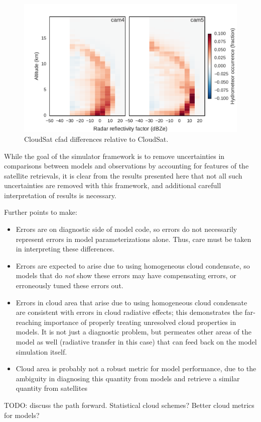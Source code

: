 \begin{figure}[htbp]
\centering
\includegraphics{graphics/cmip5_cfadDbze94_NHTropics_diff.pdf}
\caption{\label{fig:cmip5_cfads_diffs}CloudSat cfad differences relative
to CloudSat.}\label{fig:cmip5ux5fcfadsux5fdiffs}
\end{figure}

While the goal of the simulator framework is to remove uncertainties in
comparisons between models and observations by accounting for features
of the satellite retrievals, it is clear from the results presented here
that not all such uncertainties are removed with this framework, and
additional carefull interpretation of results is necessary.

Further points to make:

\begin{itemize}
\tightlist
\item
  Errors are on diagnostic side of model code, so errors do not
  necessarily represent errors in model parameterizations alone. Thus,
  care must be taken in interpreting these differences.
\item
  Errors are expected to arise due to using homogeneous cloud
  condensate, so models that do \emph{not} show these errors may have
  compensating errors, or erroneously tuned these errors out.
\item
  Errors in cloud area that arise due to using homogeneous cloud
  condensate are consistent with errors in cloud radiative effects; this
  demonstrates the far-reaching importance of properly treating
  unresolved cloud properties in models. It is not just a diagnostic
  problem, but permeates other areas of the model as well (radiative
  transfer in this case) that can feed back on the model simulation
  itself.
\item
  Cloud area is probably not a robust metric for model performance, due
  to the ambiguity in diagnosing this quantity from models and retrieve
  a similar quantity from satellites
\end{itemize}

TODO: discuss the path forward. Statistical cloud schemes? Better cloud
metrics for models?
